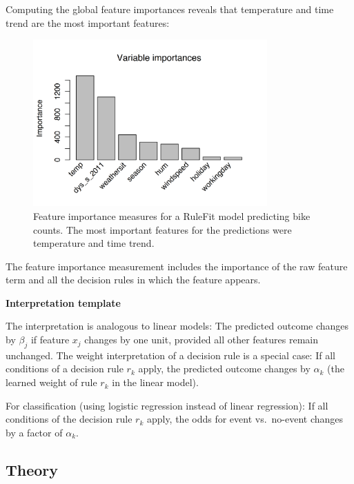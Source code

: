 \documentclass[
  11pt,
]{scrbook}
\begin{document}
Computing the global feature importances reveals that temperature and time trend are the most important features:

\begin{figure}

{\centering \includegraphics[width=0.8\textwidth]{images/rulefit-importance-1} 

}

\caption{Feature importance measures for a RuleFit model predicting bike counts. The most important features for the predictions were temperature and time trend.}\label{fig:rulefit-importance}
\end{figure}

The feature importance measurement includes the importance of the raw feature term and all the decision rules in which the feature appears.

\textbf{Interpretation template}

The interpretation is analogous to linear models:
The predicted outcome changes by \(\beta_j\) if feature \(x_j\) changes by one unit, provided all other features remain unchanged.
The weight interpretation of a decision rule is a special case:
If all conditions of a decision rule \(r_k\) apply, the predicted outcome changes by \(\alpha_k\) (the learned weight of rule \(r_k\) in the linear model).

For classification (using logistic regression instead of linear regression):
If all conditions of the decision rule \(r_k\) apply, the odds for event vs.~no-event changes by a factor of \(\alpha_k\).

\hypertarget{theory-1}{%
\subsection{Theory}\label{theory-1}}
\end{document}
